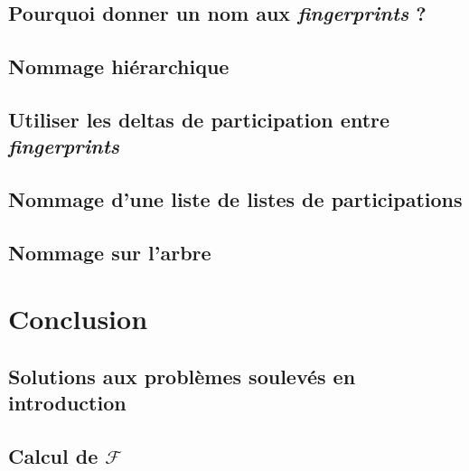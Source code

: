 \documentclass[a4paper]{article}
\begin{document}
\subsection{Pourquoi donner un nom aux \emph{fingerprints} ?}

\subsection{Nommage hiérarchique}

\subsection{Utiliser les deltas de participation entre \emph{fingerprints}}

\subsection{Nommage d'une liste de listes de participations}

\subsection{Nommage sur l'arbre}

\section{Conclusion}

\subsection{Solutions aux problèmes soulevés en introduction}

\subsection{Calcul de $\mathcal{F}$}
\end{document}
